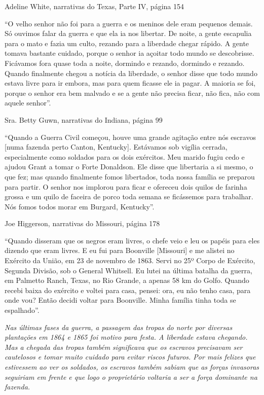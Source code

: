 Adeline White, narrativas do Texas, Parte IV, página 154

``O velho senhor não foi para a guerra e os meninos dele eram pequenos
demais. Só ouvimos falar da guerra e que ela ia nos libertar. De noite,
a gente escapulia para o mato e fazia um culto, rezando para a liberdade
chegar rápido. A gente tomava bastante cuidado, porque o senhor ia
açoitar todo mundo se descobrisse. Ficávamos fora quase toda a noite,
dormindo e rezando, dormindo e rezando. Quando finalmente chegou a
notícia da liberdade, o senhor disse que todo mundo estava livre para ir
embora, mas para quem ficasse ele ia pagar. A maioria se foi, porque o
senhor era bem malvado e se a gente não precisa ficar, não fica, não com
aquele senhor''.

Sra. Betty Guwn, narrativas do Indiana, página 99

``Quando a Guerra Civil começou, houve uma grande agitação entre nós
escravos {[}numa fazenda perto Canton, Kentucky{]}. Estávamos sob
vigília cerrada, especialmente como soldados para os dois exércitos. Meu
marido fugiu cedo e ajudou Grant a tomar o Forte Donaldson. Ele disse
que libertaria a si mesmo, o que fez; mas quando finalmente fomos
libertados, toda nossa família se preparou para partir. O senhor nos
implorou para ficar e ofereceu dois quilos de farinha grossa e um quilo
de faceira de porco toda semana se ficássemos para trabalhar. Nós fomos
todos morar em Burgard, Kentucky''.

Joe Higgerson, narrativas do Missouri, página 178

``Quando disseram que os negros eram livres, o chefe veio e leu os
papéis para eles dizendo que eram livres. E eu fui para Boonville
{[}Missouri{]} e me alistei no Exército da União, em 23 de novembro de
1863. Servi no 25º Corpo de Exército, Segunda Divisão, sob o General
Whitsell. Eu lutei na última batalha da guerra, em Palmetto Ranch,
Texas, no Rio Grande, a apenas 58 km do Golfo. Quando recebi baixa do
exército e voltei para casa, pensei: ora, eu não tenho casa, para onde
vou? Então decidi voltar para Boonville. Minha família tinha toda se
espalhado''.

\emph{Nas últimas fases da guerra, a passagem das tropas do norte por
diversas plantações em 1864 e 1865 foi motivo para festa. A liberdade
estava chegando. Mas a chegada das tropas também significava que os
escravos precisavam ser cautelosos e tomar muito cuidado para evitar
riscos futuros. Por mais felizes que estivessem ao ver os soldados, os
escravos também sabiam que as forças invasoras seguiriam em frente e que
logo o proprietário voltaria a ser a força dominante na fazenda.}

